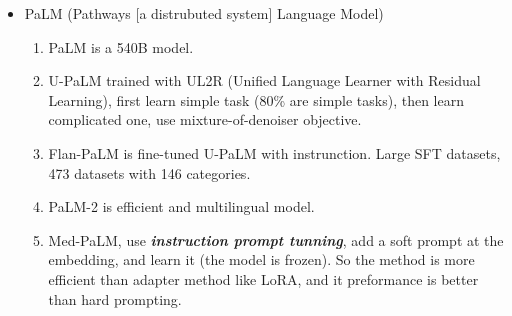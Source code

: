 \documentclass[10pt]{elegantbook}
\newcommand{\mydefination}[1]{\textbf{\textit{\textcolor{structurecolor}{#1}}}}
\begin{document}
\begin{itemize}
    \item PaLM (Pathways [a distrubuted system] Language Model)
    \begin{enumerate}
        \item PaLM is a 540B model.
        \item U-PaLM trained with UL2R (Unified Language Learner with Residual Learning), first learn simple task (80\% are simple tasks), then learn complicated
    one, use mixture-of-denoiser objective.
        \item Flan-PaLM is fine-tuned U-PaLM with instrunction. Large SFT datasets, 473 datasets with 146 categories.
        \item PaLM-2 is efficient and multilingual model.
        \item Med-PaLM, use \mydefination{instruction prompt tunning}, add a soft prompt at the embedding, and learn it (the model is frozen). So the method is
    more efficient than adapter method like LoRA, and it preformance is better than hard prompting.
    \end{enumerate}


\end{itemize}
\end{document}
